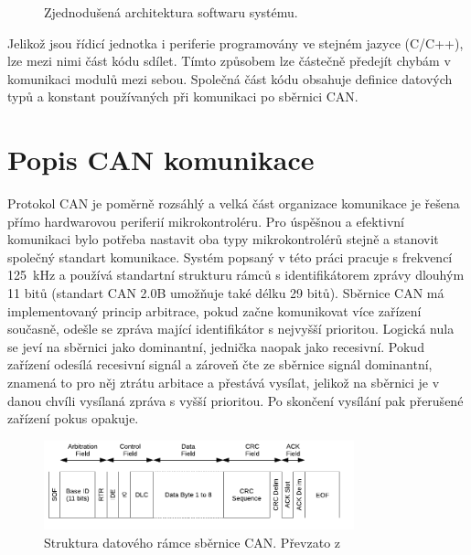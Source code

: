 \begin{figure}[h!]
        
        \caption{Zjednodušená architektura softwaru systému.}
        \label{fig:sw-blokove-schema}
    \end{figure}

    Jelikož jsou řídicí jednotka i periferie programovány ve stejném jazyce (C/C++), lze mezi nimi část kódu sdílet. Tímto způsobem lze částečně předejít chybám v komunikaci modulů mezi sebou. Společná část kódu obsahuje definice datových typů a konstant používaných při komunikaci po sběrnici CAN.  

\section{Popis CAN komunikace}
    Protokol CAN je poměrně rozsáhlý a velká část organizace komunikace je řešena přímo hardwarovou periferií mikrokontroléru. Pro úspěšnou a efektivní komunikaci bylo potřeba nastavit oba typy mikrokontrolérů stejně a stanovit společný standart komunikace. Systém popsaný v této práci pracuje s frekvencí \qty{125}{kHz} a používá standartní strukturu rámců s identifikátorem zprávy dlouhým 11 bitů (standart CAN 2.0B umožňuje také délku 29 bitů). Sběrnice CAN má implementovaný princip arbitrace, pokud začne komunikovat více zařízení současně, odešle se zpráva mající identifikátor s nejvyšší prioritou. Logická nula se jeví na sběrnici jako dominantní, jednička naopak jako recesivní. Pokud zařízení odesílá recesivní signál a zároveň čte ze sběrnice signál dominantní, znamená to pro něj ztrátu arbitace a přestává vysílat, jelikož na sběrnici je v danou chvíli vysílaná zpráva s vyšší prioritou. Po skončení vysílání pak přerušené zařízení pokus opakuje.
    
        \begin{figure}[h!]
            \centering
            \includegraphics[width=0.8\textwidth]{obrazky/can-frame.png}
            \caption{Struktura datového rámce sběrnice CAN. Převzato z~\cite{esp32-datasheet}}
            \label{fig:obrazky/can-frame.png   }
        \end{figure}
        


